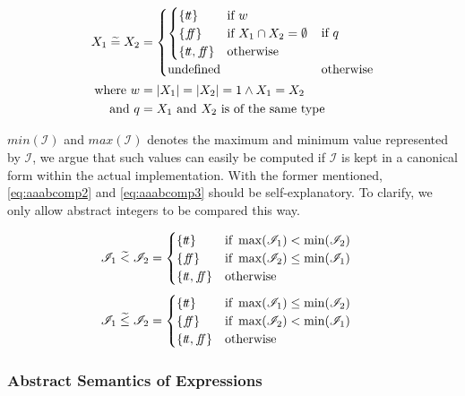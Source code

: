 \begin{align} \label{eq:aaabcomp}
    X_1 \;\aab{=}\; X_2 &= \begin{cases}
        \begin{cases}
        \{\true\} & \text{if } w\\
        \{\false\} & \text{if } X_1 \cap X_2 = \emptyset \\
        \{\true, \false\} & \text{otherwise }
        \end{cases} & \text{if $q$} \\
        \text{undefined} & \text{otherwise}
    \end{cases}\\
    \text{where } w&=|X_1| = |X_2| = 1 \land X_1 = X_2 \nonumber\\
    \text{and } q&=X_1 \text{ and } X_2 \text{ is of the same type}
\end{align}

$min(\mathscr{I})$ and $max(\mathscr{I})$ denotes the maximum and minimum value represented by $\mathscr{I}$, we argue that such values can easily be computed if $\mathscr{I}$ is kept in a canonical form within the actual implementation.
With the former mentioned, \autoref{eq:aaabcomp2} and \ref{eq:aaabcomp3} should be self-explanatory.
To clarify, we only allow abstract integers to be compared this way.

\begin{align}\label{eq:aaabcomp2}
    \mathscr{I}_1 \;\aab{<}\; \mathscr{I}_2 &= \begin{cases}
        \{\true\} & \text{if } \max(\mathscr{I}_1) < \min(\mathscr{I}_2) \\
        \{\false\} & \text{if } \max(\mathscr{I}_2) \leq \min (\mathscr{I}_1) \\
        \{\true, \false\} & \text{otherwise}
    \end{cases}
\end{align}
\begin{align}\label{eq:aaabcomp3}
    \mathscr{I}_1 \;\aab{\leq}\; \mathscr{I}_2 &= \begin{cases}
        \{\true\} & \text{if } \max(\mathscr{I}_1) \leq \min(\mathscr{I}_2) \\
        \{\false\} & \text{if } \max(\mathscr{I}_2) < \min (\mathscr{I}_1) \\
        \{\true, \false\} & \text{otherwise}
    \end{cases}
\end{align}

\subsubsection{Abstract Semantics of Expressions}

